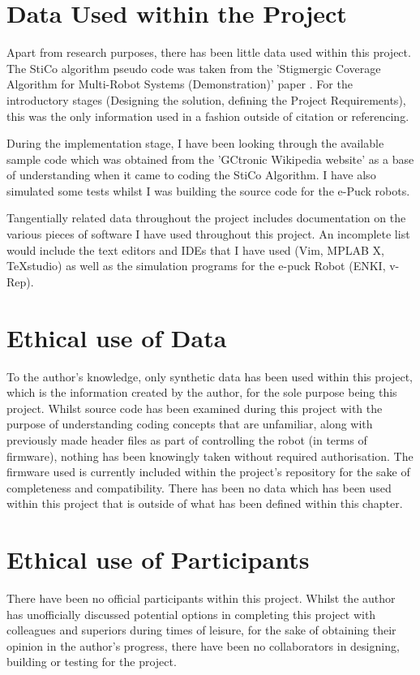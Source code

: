 \section{Data Used within the Project} \label{DataDefined}
Apart from research purposes, there has been little data used within this
project.  The StiCo algorithm pseudo code was taken from the 'Stigmergic
Coverage Algorithm for Multi-Robot Systems (Demonstration)' paper
\cite{Ranjbar-Sahraei2012Demo}.  For the introductory stages (Designing the
solution, defining the Project Requirements), this was the only information
used in a fashion outside of citation or referencing.

During the implementation stage, I have been looking through the available
sample code which was obtained from the 'GCtronic Wikipedia website'
\cite{gCtronicEpuckSite} as a base of understanding when it came to coding
the StiCo Algorithm.  I have also simulated some tests whilst I was
building the source code for the e-Puck robots.

Tangentially related data throughout the project includes documentation on the
various pieces of software I have used throughout this project.  An incomplete
list would include the text editors and IDEs that I have used (Vim, MPLAB X,
TeXstudio) as well as the simulation programs for the e-puck Robot (ENKI,
v-Rep).

\section{Ethical use of Data} \label{DataEthics}
To the author's knowledge, only synthetic data has been used within this
project, which is the information created by the author, for the sole purpose
being this project.  Whilst source code has been examined during this project
with the purpose of understanding coding concepts that are unfamiliar, along
with previously made header files as part of controlling the robot (in terms of
firmware), nothing has been knowingly taken without required authorisation.
The firmware used is currently included within the project's repository 
\cite{GithubRepo} for the sake of completeness and compatibility.
There has been no data which has been used within this project that is outside
of what has been defined within this chapter.

\section{Ethical use of Participants} \label{DataParticipants}
There have been no official participants within this project.  Whilst the
author has unofficially discussed potential options in completing this project
with colleagues and superiors during times of leisure, for the sake of
obtaining their opinion in the author's progress, there have been no
collaborators in designing, building or testing for the project.